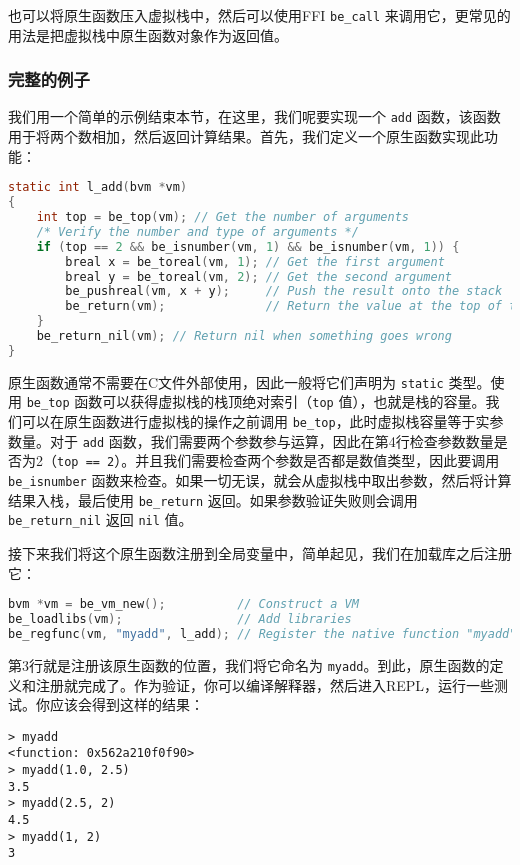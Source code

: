也可以将原生函数压入虚拟栈中，然后可以使用FFI \texttt{be\_call} 来调用它，更常见的用法是把虚拟栈中原生函数对象作为返回值。

\subsubsection{完整的例子}

我们用一个简单的示例结束本节，在这里，我们呢要实现一个 \texttt{add} 函数，该函数用于将两个数相加，然后返回计算结果。首先，我们定义一个原生函数实现此功能：
\begin{lstlisting}[language=c, style=berry]
static int l_add(bvm *vm)
{
    int top = be_top(vm); // Get the number of arguments
    /* Verify the number and type of arguments */
    if (top == 2 && be_isnumber(vm, 1) && be_isnumber(vm, 1)) {
        breal x = be_toreal(vm, 1); // Get the first argument
        breal y = be_toreal(vm, 2); // Get the second argument
        be_pushreal(vm, x + y);     // Push the result onto the stack
        be_return(vm);              // Return the value at the top of the stack
    }
    be_return_nil(vm); // Return nil when something goes wrong
}
\end{lstlisting}
原生函数通常不需要在C文件外部使用，因此一般将它们声明为 \texttt{static} 类型。使用 \texttt{be\_top} 函数可以获得虚拟栈的栈顶绝对索引（\texttt{top} 值），也就是栈的容量。我们可以在原生函数进行虚拟栈的操作之前调用 \texttt{be\_top}，此时虚拟栈容量等于实参数量。对于 \texttt{add} 函数，我们需要两个参数参与运算，因此在第4行检查参数数量是否为2（\texttt{top == 2}）。并且我们需要检查两个参数是否都是数值类型，因此要调用 \texttt{be\_isnumber} 函数来检查。如果一切无误，就会从虚拟栈中取出参数，然后将计算结果入栈，最后使用 \texttt{be\_return} 返回。如果参数验证失败则会调用 \texttt{be\_return\_nil} 返回 \texttt{nil} 值。

接下来我们将这个原生函数注册到全局变量中，简单起见，我们在加载库之后注册它：
\begin{lstlisting}[language=c, style=berry]
bvm *vm = be_vm_new();          // Construct a VM
be_loadlibs(vm);                // Add libraries
be_regfunc(vm, "myadd", l_add); // Register the native function "myadd"
\end{lstlisting}
第3行就是注册该原生函数的位置，我们将它命名为 \texttt{myadd}。到此，原生函数的定义和注册就完成了。作为验证，你可以编译解释器，然后进入REPL，运行一些测试。你应该会得到这样的结果：
\begin{lstlisting}[language=berry, numbers=none]
> myadd
<function: 0x562a210f0f90>
> myadd(1.0, 2.5)
3.5
> myadd(2.5, 2)
4.5
> myadd(1, 2)
3
\end{lstlisting}

